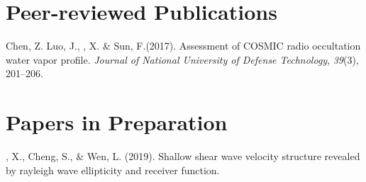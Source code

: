 \newcommand{\Revision}{\textit{under revision}}
\newcommand{\CS}{*} %
\newcommand{\CF}{\textsuperscript{\#}} %


\section*{Peer-reviewed Publications}

\begin{etaremune}
\item
    Chen, Z. Luo, J.,  \Xiao, X. \& Sun, F.(2017).
    Assessment of COSMIC radio occultation water vapor profile.
    \textit{Journal of National University of Defense Technology}, \textit{39}(3), 201--206.
\end{etaremune}

\section*{Papers in Preparation}
\begin{etaremune}
\item
    \Xiao, X., Cheng, S.,  \& Wen, L. (2019).
    Shallow shear wave velocity structure revealed by rayleigh wave ellipticity and receiver function.
\end{etaremune}

